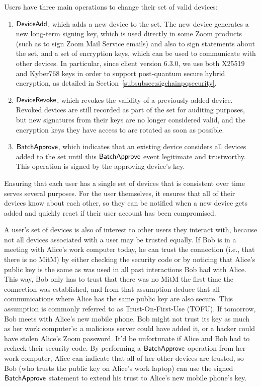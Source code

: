 Users have three main operations to change their set of valid devices:
\begin{enumerate}
\item $\mathsf{DeviceAdd}{}$, which adds a new device to the set. The new device generates a new long-term
    signing key, which is used directly in some Zoom products (such as to sign Zoom Mail Service
   emails) and also to sign statements about the set, and a set of encryption keys, which can be
    used to communicate with other devices. In particular, since client version 6.3.0, we use both
    X25519 and Kyber768 keys in order to support post-quantum secure hybrid encryption, as detailed
    in Section~\ref{subsubsec:sigchainpqsecurity}.
\item $\mathsf{DeviceRevoke}{}$, which revokes the validity of a previously-added device. Revoked devices
    are still recorded as part of the set for auditing purposes, but new signatures from their keys
    are no longer considered valid, and the encryption keys they have access to are rotated as soon
    as possible.
\item $\mathsf{BatchApprove}{}$, which indicates that an existing device considers all devices added to the
    set until this $\mathsf{BatchApprove}{}$ event legitimate and trustworthy. This operation is signed by
    the approving device's key.
\end{enumerate}

Ensuring that each user has a single set of devices that is consistent over time serves several
purposes. For the user themselves, it ensures that all of their devices know about each other, so
they can be notified when a new device gets added and quickly react if their user account has been
compromised.

A user's set of devices is also of interest to other users they interact with, because not all
devices associated with a user may be trusted equally. If Bob is in a meeting with Alice's work
computer today, he can trust the connection (i.e., that there is no MitM) by either checking the
security code or by noticing that Alice's public key is the same as was used in all past
interactions Bob had with Alice. This way, Bob only has to trust that there was no MitM the first
time the connection was established, and from that assumption deduce that all communications where
Alice has the same public key are also secure. This assumption is commonly referred to as
Trust-On-First-Use (TOFU). If tomorrow, Bob meets with Alice's new mobile phone, Bob might not trust
its key as much as her work computer's: a malicious server could have added it, or a hacker could
have stolen Alice's Zoom password. It'd be unfortunate if Alice and Bob had to recheck their
security code. By performing a $\mathsf{BatchApprove}{}$ operation from her work computer, Alice can
indicate that all of her other devices are trusted, so Bob (who trusts the public key on Alice's
work laptop) can use the signed $\mathsf{BatchApprove}{}$ statement to extend his trust to Alice's new
mobile phone's key.

